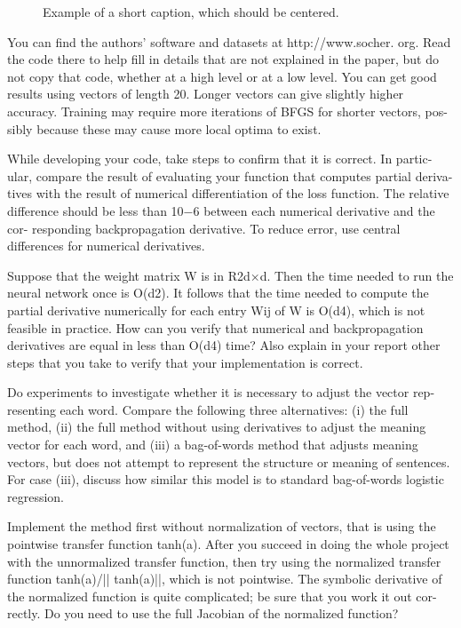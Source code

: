 \documentclass[10pt,twocolumn,letterpaper]{article}
\begin{document}
\begin{figure*}
\begin{center}
\fbox{\rule{0pt}{2in} \rule{.9\linewidth}{0pt}}
\end{center}
   \caption{Example of a short caption, which should be centered.}
\label{fig:short}
\end{figure*}


You can find the authors’ software and datasets at http://www.socher. org. Read the code there to help fill in details that are not explained in the paper, but do not copy that code, whether at a high level or at a low level. You can get good results using vectors of length 20. Longer vectors can give slightly higher accuracy. Training may require more iterations of BFGS for shorter vectors, pos- sibly because these may cause more local optima to exist.

While developing your code, take steps to confirm that it is correct. In partic- ular, compare the result of evaluating your function that computes partial deriva- tives with the result of numerical differentiation of the loss function. The relative difference should be less than 10−6 between each numerical derivative and the cor- responding backpropagation derivative. To reduce error, use central differences for numerical derivatives.

Suppose that the weight matrix W is in R2d×d. Then the time needed to run the neural network once is O(d2). It follows that the time needed to compute the partial derivative numerically for each entry Wij of W is O(d4), which is not feasible in practice. How can you verify that numerical and backpropagation derivatives are equal in less than O(d4) time? Also explain in your report other steps that you take to verify that your implementation is correct.

Do experiments to investigate whether it is necessary to adjust the vector rep- resenting each word. Compare the following three alternatives: (i) the full method, (ii) the full method without using derivatives to adjust the meaning vector for each word, and (iii) a bag-of-words method that adjusts meaning vectors, but does not attempt to represent the structure or meaning of sentences. For case (iii), discuss how similar this model is to standard bag-of-words logistic regression.

Implement the method first without normalization of vectors, that is using the pointwise transfer function tanh(a). After you succeed in doing the whole project with the unnormalized transfer function, then try using the normalized transfer function tanh(a)/|| tanh(a)||, which is not pointwise. The symbolic derivative of the normalized function is quite complicated; be sure that you work it out cor- rectly. Do you need to use the full Jacobian of the normalized function?
\end{document}
